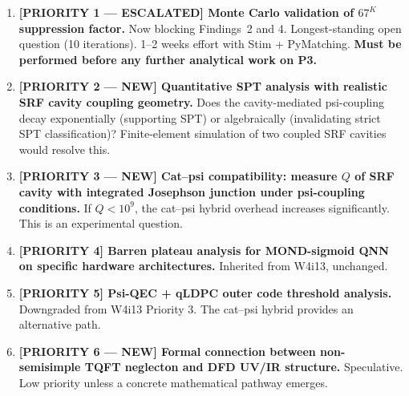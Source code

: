 \documentclass[11pt]{article}
\theoremstyle{definition}
\theoremstyle{remark}
\begin{document}
\begin{enumerate}

\item \textbf{[PRIORITY 1 --- ESCALATED] Monte Carlo validation of $67^K$
  suppression factor.}
  Now blocking Findings~2 and 4.  Longest-standing open question
  (10 iterations).  1--2 weeks effort with Stim + PyMatching.
  \textbf{Must be performed before any further analytical work on P3.}

\item \textbf{[PRIORITY 2 --- NEW] Quantitative SPT analysis with
  realistic SRF cavity coupling geometry.}
  Does the cavity-mediated psi-coupling decay exponentially (supporting
  SPT) or algebraically (invalidating strict SPT classification)?
  Finite-element simulation of two coupled SRF cavities would resolve this.

\item \textbf{[PRIORITY 3 --- NEW] Cat--psi compatibility: measure
  $Q$ of SRF cavity with integrated Josephson junction under psi-coupling
  conditions.}
  If $Q < 10^9$, the cat--psi hybrid overhead increases significantly.
  This is an experimental question.

\item \textbf{[PRIORITY 4] Barren plateau analysis for MOND-sigmoid QNN
  on specific hardware architectures.}
  Inherited from W4i13, unchanged.

\item \textbf{[PRIORITY 5] Psi-QEC + qLDPC outer code threshold analysis.}
  Downgraded from W4i13 Priority 3.  The cat--psi hybrid provides an
  alternative path.

\item \textbf{[PRIORITY 6 --- NEW] Formal connection between non-semisimple
  TQFT neglecton and DFD UV/IR structure.}
  Speculative.  Low priority unless a concrete mathematical pathway emerges.

\end{enumerate}
\end{document}
